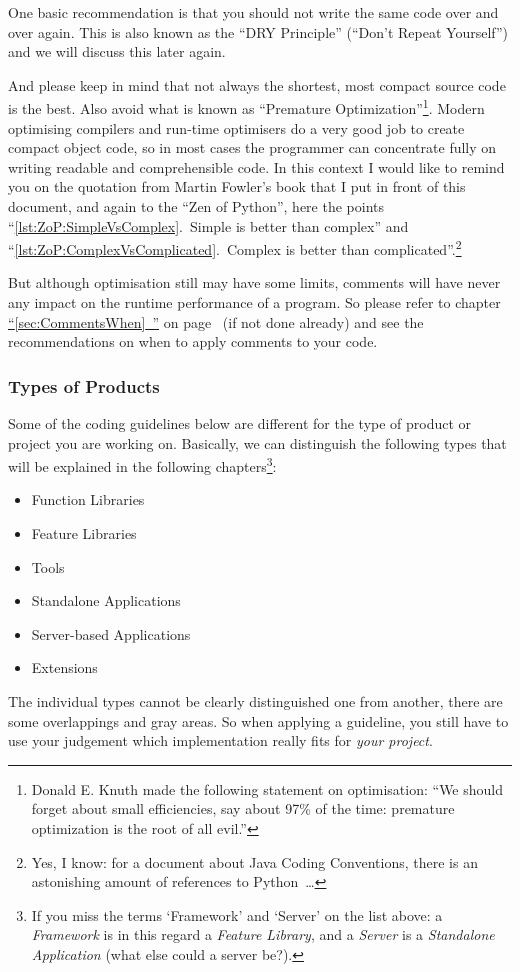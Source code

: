 \documentclass[11pt,a4paper, titlepage, parskip=half, headsepline, footsepline, cleardoublepage=current, headheight=1cm]{scrbook}
\newcommand*{\tqfullvref}[1]{\hyperref[{#1}]{“\ref*{#1}~\nameref*{#1}”} on page~\pageref{#1}}
\begin{document}
One basic recommendation is that you should not write the same code over and over again. This is also known as the “DRY Principle” (“Don't Repeat Yourself”) and we will discuss this later again.

And please keep in mind that not always the shortest, most compact source code is the best. Also avoid what is known as “Premature Optimization”\footnote{Donald E. Knuth made the following statement on optimisation: “We should forget about small efficiencies, say about 97\% of the time: premature optimization is the root of all evil.”\autocite{Knuth:PrematureOptimization}}. Modern optimising compilers and run-time optimisers do a very good job to create compact object code, so in most cases the programmer can concentrate fully on writing readable and comprehensible code. In this context I would like to remind you on the quotation from Martin Fowler's book that I put in front of this document, and again to the “Zen of Python”, here the points “\ref{lst:ZoP:SimpleVsComplex}.~Simple is better than complex” and “\ref{lst:ZoP:ComplexVsComplicated}.~Complex is better than complicated”.\footnote{Yes, I know: for a document about Java Coding Conventions, there is an astonishing amount of references to Python~…}

But although optimisation still may have some limits, comments will have never any impact on the runtime performance of a program. So please refer to chapter \tqfullvref{sec:CommentsWhen} (if not done already) and see the recommendations on when to apply comments to your code.

\subsubsection{Types of Products}\label{sec:TypesOfProducts}
Some of the coding guidelines below are different for the type of product or project you are working on. Basically, we can distinguish the following types that will be explained in the following chapters\footnote{If you miss the terms ‘Framework’ and ‘Server’ on the list above: a \textit{Framework} is in this regard a \textit{Feature Library}, and a \textit{Server} is a \textit{Standalone Application} (what else could a server be?).}:
\begin{itemize}[nosep]
\item{Function Libraries}
\item{Feature Libraries}
\item{Tools}
\item{Standalone Applications}
\item{Server-based Applications}
\item{Extensions}
\end{itemize}
The individual types cannot be clearly distinguished one from another, there are some overlappings and gray areas. So when applying a guideline, you still have to use your judgement which implementation really fits for \textit{your project}.
\end{document}
